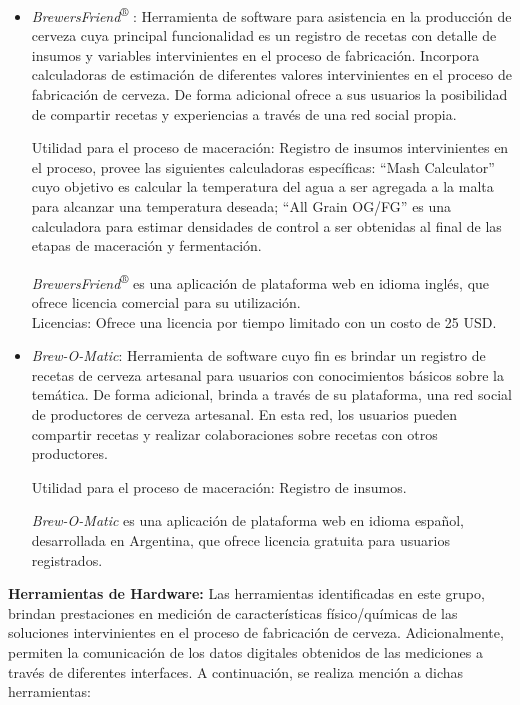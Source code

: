\begin{itemize}
        \item{\textit{BrewersFriend}\textsuperscript{®} }: Herramienta de software para asistencia en la producción de cerveza cuya principal funcionalidad es un registro de recetas con detalle de insumos y variables intervinientes en el proceso de fabricación. Incorpora calculadoras de estimación de diferentes valores intervinientes en el proceso de fabricación de cerveza. De forma adicional ofrece a sus usuarios la posibilidad de compartir recetas y experiencias a través de una red social propia.
        \par
        Utilidad para el proceso de maceración: Registro de insumos intervinientes en el proceso, provee las siguientes calculadoras específicas: ``Mash Calculator'' cuyo objetivo es calcular la temperatura del agua a ser agregada a la malta para alcanzar una temperatura deseada; ``All Grain OG/FG'' es una calculadora para estimar densidades de control a ser obtenidas al final de las etapas de maceración y fermentación.
        \par
        \textit{BrewersFriend}\textsuperscript{®} es una aplicación de plataforma web en idioma inglés, que ofrece licencia comercial para su utilización.\\
        Licencias: Ofrece una licencia por tiempo limitado con un costo de 25 USD.
        
        \item{\textit{Brew-O-Matic}}: Herramienta de software cuyo fin es brindar un registro de recetas de cerveza artesanal para usuarios con conocimientos básicos sobre la temática. De forma adicional, brinda a través de su plataforma, una red social de productores de cerveza artesanal. En esta red, los usuarios pueden compartir recetas y realizar colaboraciones sobre recetas con otros productores.
        \par
        Utilidad para el proceso de maceración: Registro de insumos.
        \par
        \textit{Brew-O-Matic} es una aplicación de plataforma web en idioma español, desarrollada en Argentina, que ofrece licencia gratuita para usuarios registrados.
        
    \end{itemize}
    \par
    \textbf{Herramientas de Hardware:}
    Las herramientas identificadas en este grupo, brindan prestaciones en medición de características físico/químicas de las soluciones intervinientes en el proceso de fabricación de cerveza. Adicionalmente, permiten la comunicación de los datos digitales obtenidos de las mediciones a través de diferentes interfaces. A continuación, se realiza mención a dichas herramientas:

